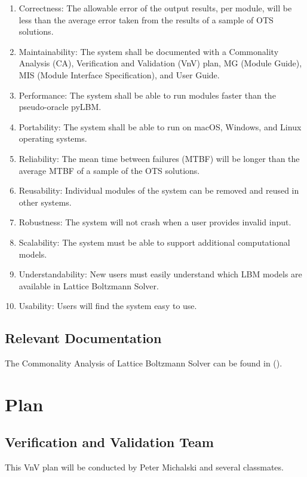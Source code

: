 \documentclass[12pt, titlepage]{article}
\newcommand{\myprogname}{Lattice Boltzmann Solver}
\begin{document}
\begin{enumerate}
\item Correctness: The allowable error of the output results, per module, will be less than the average error taken from the results of a sample of OTS solutions.
\item Maintainability: The system shall be documented with a Commonality Analysis (CA), Verification and Validation (VnV) plan, MG (Module Guide), MIS (Module Interface Specification), and User Guide.
\item Performance: The system shall be able to run modules faster than the pseudo-oracle pyLBM.
\item Portability: The system shall be able to run on macOS, Windows, and Linux operating systems.
\item Reliability: The mean time between failures (MTBF) will be longer than the average MTBF of a sample of the OTS solutions.
\item Reusability: Individual modules of the system can be removed and reused in other systems.
\item Robustness: The system will not crash when a user provides invalid input.
\item Scalability: The system must be able to support additional computational models.
\item Understandability: New users must easily understand which LBM models are available in {\myprogname}.
\item Usability: Users will find the system easy to use.
\end{enumerate}


\subsection{Relevant Documentation}

The Commonality Analysis of {\myprogname} can be found in (\citet{LBM_CA_PM}).\\ 

\newpage

\section{Plan}
\label{testplan}	
\subsection{Verification and Validation Team}

This VnV plan will be conducted by Peter Michalski and several classmates.
\end{document}
